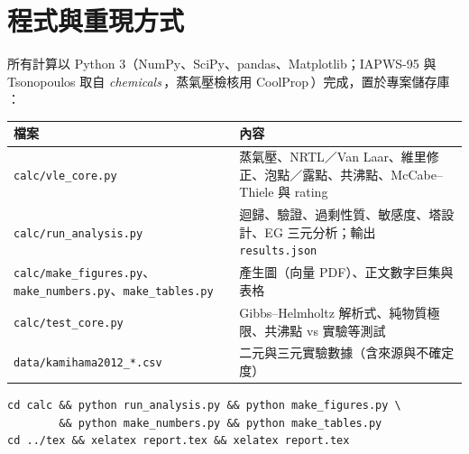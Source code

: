 \documentclass[UTF8,a4paper,11pt,fontset=none,zihao=-4]{ctexart}
\numberwithin{equation}{section}\renewcommand{\theequation}{\arabic{section}.\arabic{equation}}
\numberwithin{figure}{section}\renewcommand{\thefigure}{\arabic{section}.\arabic{figure}}
\numberwithin{table}{section}\renewcommand{\thetable}{\arabic{section}.\arabic{table}}
\begin{document}
\section{程式與重現方式}\label{app:code}
所有計算以 Python 3（NumPy、SciPy、pandas、Matplotlib；IAPWS-95 與 Tsonopoulos 取自 \textit{chemicals}\,\cite{thermo}，蒸氣壓檢核用 CoolProp\,\cite{coolprop}）完成，置於專案儲存庫 ：
\begin{center}\small
\begin{tabularx}{\linewidth}{@{}l>{\raggedright\arraybackslash}X@{}}
\toprule
檔案 & 內容 \\
\midrule
\texttt{calc/vle\_core.py} & 蒸氣壓、NRTL／Van Laar、維里修正、泡點／露點、共沸點、McCabe--Thiele 與 rating \\
\texttt{calc/run\_analysis.py} & 迴歸、驗證、過剩性質、敏感度、塔設計、EG 三元分析；輸出 \texttt{results.json} \\
\texttt{calc/make\_figures.py}、\texttt{make\_numbers.py}、\texttt{make\_tables.py} & 產生圖（向量 PDF）、正文數字巨集與表格 \\
\texttt{calc/test\_core.py} & Gibbs--Helmholtz 解析式、純物質極限、共沸點 vs 實驗等測試 \\
\texttt{data/kamihama2012\_*.csv} & 二元與三元實驗數據（含來源與不確定度） \\
\bottomrule
\end{tabularx}
\end{center}
\begin{verbatim}
cd calc && python run_analysis.py && python make_figures.py \
        && python make_numbers.py && python make_tables.py
cd ../tex && xelatex report.tex && xelatex report.tex
\end{verbatim}
\end{document}
